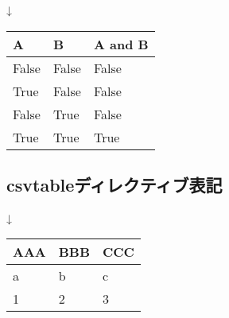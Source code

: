 \documentclass[letterpaper,10pt,dvipdfmx,openany,oneside]{sphinxmanual}
\begin{document}
↓


\begin{savenotes}\sphinxattablestart
\centering
\begin{tabulary}{\linewidth}[t]{|T|T|T|}
\hline
\sphinxstyletheadfamily 
A
&\sphinxstyletheadfamily 
B
&\sphinxstyletheadfamily 
A and B
\\
\hline
False
&
False
&
False
\\
\hline
True
&
False
&
False
\\
\hline
False
&
True
&
False
\\
\hline
True
&
True
&
True
\\
\hline
\end{tabulary}
\par
\sphinxattableend\end{savenotes}


\subsection{csv\sphinxhyphen{}tableディレクティブ表記}
\label{\detokenize{1.chapter/basic_syntax:csv-table}}
\begin{sphinxVerbatim}[commandchars=\\\{\}]
 
      
    
    

\end{sphinxVerbatim}

↓


\begin{savenotes}\sphinxattablestart
\raggedright
\begin{tabulary}{\linewidth}[t]{|T|T|T|}
\hline
\sphinxstyletheadfamily 
AAA
&\sphinxstyletheadfamily 
BBB
&\sphinxstyletheadfamily 
CCC
\\
\hline
a
&
b
&
c
\\
&
2
&
3
\\
\hline
\end{tabulary}
\par
\sphinxattableend\end{savenotes}
\end{document}
